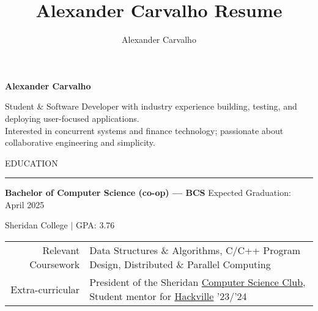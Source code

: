 \documentclass[9pt]{extarticle}
\title{Alexander Carvalho Resume}
\author{Alexander Carvalho}
\begin{document}
\color{regtextgray}

\fontsize{10pt}{11.4pt} \selectfont

\begin{center}

	\textcolor{imptextblack}{\textbf{\fontsize{21}{0}\selectfont Alexander Carvalho}}

	\vspace{5pt}	



	Student \& Software Developer with industry experience building, testing, and deploying user-focused applications. \\
	Interested in concurrent systems and finance technology; passionate about collaborative engineering and simplicity.
\end{center}

\fontsize{9.5pt}{11.4pt} \selectfont

\begin{adjustwidth}{4pt}{4pt} \large {\selectfont EDUCATION} \end{adjustwidth}
\rule[8pt]{\linewidth}{0.4pt}

\begin{adjustwidth}{10pt}{10pt}
	\vspace{-5pt}	

	\textcolor{imptextblack}{\textbf{\large Bachelor of Computer Science (co-op) — BCS}} \hfill Expected Graduation: April 2025
	
	Sheridan College $|$ {\small GPA: 3.76}
	
	\begin{adjustwidth}{18pt}{18pt}
		\begin{tabular}{ r l }
		 	\textcolor{imptextblack}{Relevant Coursework} & Data Structures \& Algorithms, C/C++ Program Design, Distributed \& Parallel Computing \\ 
			\textcolor{imptextblack}{Extra-curricular} & President of the Sheridan \href{https://sheridancollege.campuslabs.ca/engage/organization/mobilecomputingclub}{Computer Science Club},
				Student mentor for \href{https://www.hackville.io/}{Hackville} {\small '23/'24} \\
		\end{tabular}
	\end{adjustwidth}
\end{adjustwidth}
\end{document}
